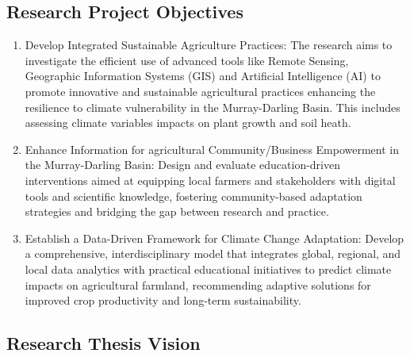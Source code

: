 


\subsection{Research Project Objectives}
\begin{enumerate}
    \item Develop Integrated Sustainable Agriculture Practices: The research aims to investigate the efficient use of advanced tools like Remote Sensing, Geographic Information Systems (GIS) and Artificial Intelligence (AI) to promote innovative and sustainable agricultural practices enhancing the resilience to climate vulnerability in the Murray-Darling Basin. This includes assessing climate variables impacts on plant growth and soil heath. 
    
    \item Enhance Information for agricultural Community/Business Empowerment in the Murray-Darling Basin: Design and evaluate education-driven interventions aimed at equipping local farmers and stakeholders with digital tools and scientific knowledge, fostering community-based adaptation strategies and bridging the gap between research and practice.
    
    \item Establish a Data-Driven Framework for Climate Change Adaptation: Develop a comprehensive, interdisciplinary model that integrates global, regional, and local data analytics with practical educational initiatives to predict climate impacts on agricultural farmland, recommending adaptive solutions for improved crop productivity and long-term sustainability.
\end{enumerate}

\subsection{Research Thesis Vision}

